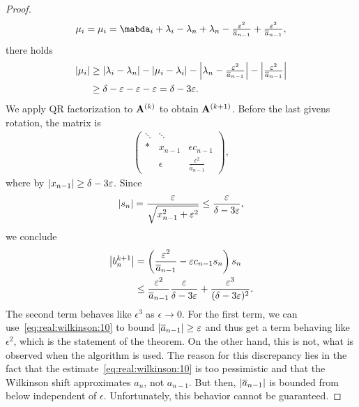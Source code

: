 \begin{proof}
\begin{gather}
  \mu_i = \mu_i = \mabda_i+\lambda_i-\lambda_n+\lambda_n
  -\tfrac{\epsilon^2}{\overline a_{n-1}}+\tfrac{\epsilon^2}{\overline a_{n-1}},
\end{gather}
there holds
\begin{align}
  \abs*{\mu_i}
  &\ge \abs*{\lambda_i-\lambda_n} - \abs*{\mu_i-\lambda_i}
    - \abs*{\lambda_n - \tfrac{\epsilon^2}{\overline a_{n-1}}}
    - \abs*{\tfrac{\epsilon^2}{\overline a_{n-1}}}\\
  &\ge \delta - \epsilon - \epsilon -\epsilon = \delta-3\epsilon.
\end{align}
We apply QR factorization to $\mata^{(k)}$ to obtain
$\mata^{(k+1)}$. Before the last givens rotation, the matrix is
\begin{gather}
  \begin{pmatrix}
    \ddots&\ddots&\\
    * & x_{n-1} & \epsilon c_{n-1}\\
    & \epsilon & \tfrac{\epsilon^2}{\overline a_{n-1}}
  \end{pmatrix},
\end{gather}
where by  $\abs{x_{n-1}} \ge \delta-3\epsilon$. Since
\begin{gather}
  \abs{s_n} = \frac{\epsilon}{\sqrt{x_{n-1}^2+\epsilon^2}} \le \frac{\epsilon}{\delta-3\epsilon},
\end{gather}
we conclude
\begin{align}
  \abs*{b_n^{k+1}}
  &= \left(\frac{\epsilon^2}{\overline a_{n-1}} - \epsilon c_{n-1}s_n \right) s_n\\
  &\le \frac{\epsilon^2}{\overline a_{n-1}} \frac{\epsilon}{\delta-3\epsilon}
    + \frac{\epsilon^3}{(\delta-3\epsilon)^2}.
\end{align}
The second term behaves like $\epsilon^3$ as $\epsilon\to0$. For the
first term, we can use~\eqref{eq:real:wilkinson:10} to bound
$\abs{\overline a_{n-1}}\ge\epsilon$ and thus get a term behaving like
$\epsilon^2$, which is the statement of the theorem. On the other
hand, this is not, what is observed when the algorithm is used. The
reason for this discrepancy lies in the fact that the
estimate~\eqref{eq:real:wilkinson:10} is too pessimistic and that the
Wilkinson shift approximates $a_n$, not $a_{n-1}$. But then,
$\abs{\overline a_{n-1}}$ is bounded from below independent of
$\epsilon$. Unfortunately, this behavior cannot be guaranteed.
\end{proof}

